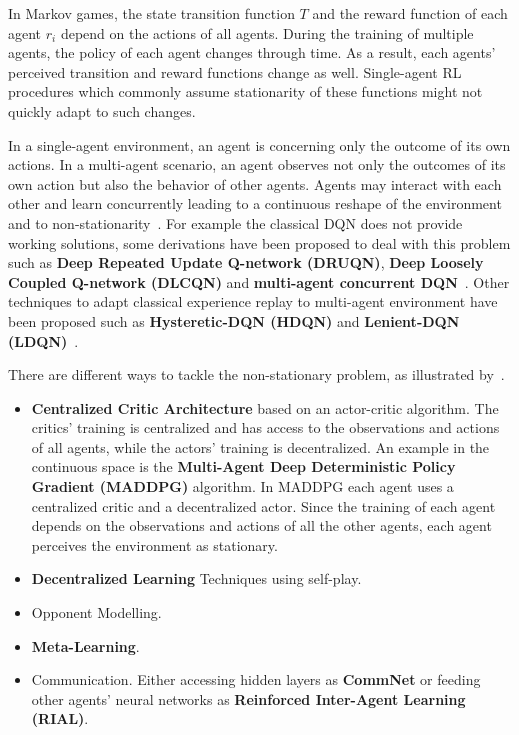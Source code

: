 \documentclass[11pt, a4paper, hidelinks]{report}
\begin{document}
\begin{quoting}[font=itshape, begintext={"}, endtext={"\citep{papoudakis2019dealing}}]
In Markov games, the state transition function $T$ and the reward function of each agent $r_i$ depend on the actions of all agents.
During the training of multiple agents, the policy of each agent changes through time.
As a result, each agents’ perceived transition and reward functions change as well.
Single-agent RL procedures which commonly assume stationarity of these functions might not quickly adapt to such changes.
\end{quoting}

In a single-agent environment, an agent is concerning only the outcome of its own actions.
In a multi-agent scenario, an agent observes not only the outcomes of its own action but also the behavior of other agents.
Agents may interact with each other and learn concurrently leading to a continuous reshape of the environment and to non-stationarity~\citep{zhang2019multiagent}.
For example the classical DQN does not provide working solutions, some derivations have been proposed to deal with this problem such as \textbf{Deep Repeated Update Q-network (DRUQN)}, \textbf{Deep Loosely Coupled Q-network (DLCQN)} and \textbf{ multi-agent concurrent DQN}~\citep{castaneda}.
Other techniques to adapt classical experience replay to multi-agent environment have been proposed such as \textbf{Hysteretic-DQN (HDQN)} and \textbf{Lenient-DQN (LDQN)}~\citep{Nguyen-2020}.

There are different ways to tackle the non-stationary problem, as illustrated by~\citep{papoudakis2019dealing}.
\begin{itemize}
	\item \textbf{Centralized Critic Architecture} based on an actor-critic algorithm.
The critics' training is centralized and has access to the observations and actions of all agents, while the actors' training is decentralized.
An example in the continuous space is the \textbf{Multi-Agent Deep Deterministic Policy Gradient (MADDPG)} algorithm.
In MADDPG each agent uses a centralized critic and a decentralized actor.
Since the training of each agent depends on the observations and actions of all the other agents, each agent perceives the environment as stationary.
	\item \textbf{Decentralized Learning} Techniques using self-play.
	\item Opponent Modelling.
	\item \textbf{Meta-Learning}.
	\item Communication.
Either accessing hidden layers as \textbf{CommNet} or feeding other agents' neural networks as \textbf{Reinforced Inter-Agent Learning (RIAL)}.
\end{itemize}
\end{document}
